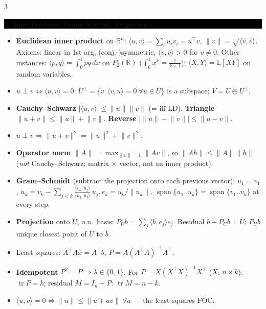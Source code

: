 \documentclass[8pt,letterpaper]{article}
\makeatletter
\newcommand{\sect}[1]{%
  \vspace{2.2pt}%
  \noindent\colorbox{black}{\parbox{\dimexpr\linewidth-2\fboxsep}{%
    \color{white}\bfseries\scshape\fontsize{6.4}{7.4}\selectfont
    \hyphenpenalty=10000\exhyphenpenalty=10000\raggedright #1}}%
  \vspace{1.4pt}\par\nopagebreak\@afterheading}
\newenvironment{tl}
  {\begin{itemize}[leftmargin=6pt,itemsep=0.3pt,topsep=1pt,parsep=0pt,
                   partopsep=0pt,label=\textcolor{gray}{\tiny$\bullet$}]}
  {\end{itemize}}
\newcommand{\R}{\mathbb{R}}
\newcommand{\Rn}{\mathbb{R}^n}
\newcommand{\E}{\mathbb{E}}
\newcommand{\tr}{\operatorname{tr}}
\newcommand{\spn}{\operatorname{span}}
\newcommand{\tp}{^{\!\top}}
\newcommand{\ip}[2]{\langle #1,#2\rangle}
\newcommand{\nm}[1]{\lVert #1\rVert}
\makeatother
\begin{document}
\begin{multicols}{3}
\sect{6. Inner Products, Gram--Schmidt, Projection}
\begin{tl}
\item \textbf{Euclidean inner product} on $\Rn$: $\ip{u}{v}=\sum_i u_iv_i=u\tp v$, $\nm{v}=\sqrt{\ip{v}{v}}$. Axioms: linear in 1st arg, (conj.-)symmetric, $\ip{v}{v}>0$ for $v\neq0$. Other instances: $\ip{p}{q}=\int_0^1pq\,dx$ on $P_2(\R)$ ($\int_0^1x^k=\frac1{k+1}$); $\ip{X}{Y}=\E[XY]$ on random variables.
\item $u\perp v\iff\ip{u}{v}=0$. $U^\perp=\{v:\ip{v}{u}=0\ \forall u\in U\}$ is a subspace; $V=U\oplus U^\perp$.
\item \textbf{Cauchy--Schwarz} $|\ip{u}{v}|\le\nm{u}\nm{v}$ (= iff LD). \textbf{Triangle} $\nm{u+v}\le\nm{u}+\nm{v}$. \textbf{Reverse} $\big|\nm{u}-\nm{v}\big|\le\nm{u-v}$.
\item $u\perp v\Rightarrow\nm{u+v}^2=\nm{u}^2+\nm{v}^2$.
\item \textbf{Operator norm} $\nm{A}=\max_{\nm{v}=1}\nm{Av}$, so $\nm{Ah}\le\nm{A}\nm{h}$ (\emph{not} Cauchy--Schwarz: matrix $\times$ vector, not an inner product).
\item \textbf{Gram--Schmidt} (subtract the projection onto each previous vector):
$u_1=v_1$,
$u_k=v_k-\sum_{j<k}\frac{\ip{v_k}{u_j}}{\ip{u_j}{u_j}}\,u_j,
e_k=u_k/\nm{u_k}$.
 $\spn\{u_1..u_k\}=\spn\{v_1..v_k\}$ at every step.
\item \textbf{Projection} onto $U$, o.n.\ basis: $P_Ub=\sum_j\ip{b}{e_j}e_j$. Residual $b-P_Ub\perp U$; $P_Ub$ unique closest point of $U$ to $b$.
\item Least squares: $A\tp A\hat x=A\tp b$, $P=A(A\tp A)^{-1}A\tp$.
\item \textbf{Idempotent} $P^2=P\Rightarrow\lambda\in\{0,1\}$. For $P=X(X\tp X)^{-1}X\tp$ ($X$: $n\times k$): $\tr P=k$; residual $M=I_n-P$: $\tr M=n-k$.
\item \textbf{$\ip{u}{v}=0\iff\nm{u}\le\nm{u+av}\ \forall a$} --- the least-squares FOC.
\end{tl}


\end{multicols}
\end{document}
